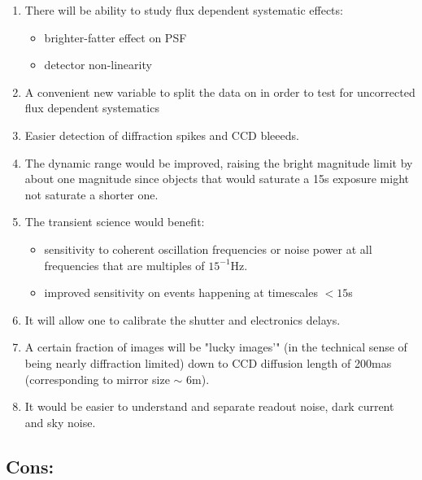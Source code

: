 \documentclass[12pt, a4paper]{article}
\begin{document}
\begin{enumerate}

\item There will be ability to study flux dependent systematic effects:
  \begin{itemize}
  \item brighter-fatter effect on PSF
  \item detector non-linearity
\end{itemize}

\item A convenient new variable to split the data on in order to test for
  uncorrected flux dependent systematics

\item Easier detection of diffraction spikes and CCD bleeeds.

\item The  dynamic range would be improved, raising the bright
  magnitude limit by about one magnitude since objects that would saturate a 15s
  exposure might not saturate a shorter one.

\item The transient science would benefit:
  \begin{itemize}
  \item sensitivity to coherent oscillation frequencies or noise power at all
    frequencies that are multiples  of $15^{-1}$Hz.
  \item improved sensitivity on events happening at timescales $<15$s 
  \end{itemize}

\item It will allow one to calibrate the shutter and electronics delays.

\item A certain fraction of images will be "lucky images'" (in the
  technical sense of being nearly diffraction limited) down to
  CCD diffusion length of 200mas (corresponding to mirror size $\sim$
  6m).

\item It would be easier to understand and separate readout noise, dark
  current and sky noise.

\end{enumerate}

\subsection*{Cons:}
\end{document}
